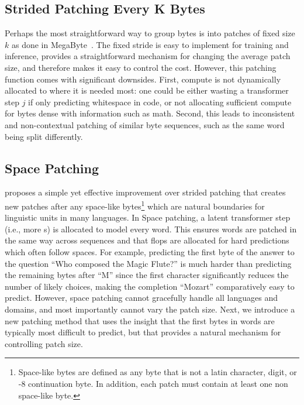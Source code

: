 \documentclass[]{fairmeta}
\begin{document}
\subsection{Strided Patching Every K Bytes}
\label{section:static-patch}

Perhaps the most straightforward way to group bytes is into patches of fixed size $k$ as done in MegaByte~\citep{yu2023megabyte}.
The fixed stride is easy to implement for training and inference, provides a straightforward mechanism for changing the average patch size, and therefore makes it easy to control the \flop{} cost.
However, this patching function comes with significant downsides.
First, compute is not dynamically allocated to where it is needed most: one could be either wasting a transformer step $j$ if only predicting whitespace in code, or not allocating sufficient compute for bytes dense with information such as math.
Second, this leads to inconsistent and non-contextual patching of similar byte sequences, such as the same word being split differently.

\subsection{Space Patching}
\label{section:white-patch}

\citet{slagle2024spacebyte} proposes a simple yet effective
improvement over strided patching that creates new patches after any space-like bytes\footnote{
    Space-like bytes are defined as any byte that is not a latin character, digit, or -8 continuation byte.
    In addition, each patch must contain at least one non space-like byte.
}
which are natural boundaries for linguistic units in many languages. 
In Space patching, a latent transformer step (i.e., more \flop{}s) is allocated to model every word.
This ensures words are patched in the same way across sequences and that flops are allocated for hard predictions which often follow spaces. For example, predicting the first byte of the answer to the question ``Who composed the Magic Flute?\uline{\hspace{.6em}}'' is much harder than predicting the remaining bytes after ``M'' since the first character significantly reduces the number of likely choices, making the completion ``Mozart'' comparatively easy to predict.
However, space patching cannot gracefully handle all languages and domains, and most importantly cannot vary the patch size.
Next, we introduce a new patching method that uses the insight that the first bytes in words are typically most difficult to predict, but that provides a natural mechanism for controlling patch size.
\end{document}
